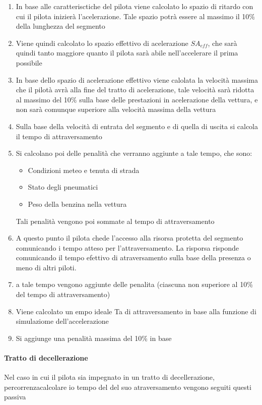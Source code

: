 \documentclass[a4paper,11pt, twoside]{book}
\begin{document}
	    \begin{enumerate}
	      \item In base alle caratterisctiche del pilota viene calcolato lo spazio di ritardo con cui il
		    pilota inizierà l'acelerazione. Tale spazio potrà essere al massimo il 10$\%$ della lunghezza del segmento
	      \item Viene quindi calcolato lo spazio effettivo di acelerazione $SA_{eff}$, che sarà quindi tanto maggiore quanto
		    il pilota sarà abile nell'accelerare il prima possibile
	      \item In base dello spazio di acelerazione effettivo viene calolata la velocità massima che il pilotà avrà alla fine del 
		    tratto di acelerazione,
		    tale velocità sarà ridotta al massimo del 10$\%$ sulla base delle prestazioni in acelerazione della vettura,
		    e non sarà comunque superiore alla velocità massima della vettura
	      \item Sulla base della velocità di entrata del segmento e di quella di uscita si calcola il tempo di attraversamento
	      \item Si calcolano poi delle penalità che verranno aggiunte a tale tempo, che sono:
		    \begin{itemize}
		      \item Condizioni meteo e tenuta di strada
		      \item Stato degli pneumatici
		      \item Peso della benzina nella vettura
		    \end{itemize}
		    Tali penalità vengono poi sommate al tempo di attraversamento
	      \item A questo punto il pilota chede l'accesso alla risorsa protetta del segmento
		    comunicando i tempo atteso per l'attraversamento. La risporsa risponde comunicando il tempo
		    efettivo di atraversamento sulla base della presenza o meno di altri piloti.
	      
	      \item a tale tempo vengono aggiunte delle penalita (ciascuna non superiore al 10\% del tempo di attraversamento)
	      \item Viene calcolato un empo ideale Ta di attraversamento in base alla funzione di simulaziome dell'accelerazione
	      \item Si aggiunge una penalità massima del 10\% in base  
	    \end{enumerate}
	    
	  \paragraph{Tratto di decellerazione}
	    Nel caso in cui il pilota sia impegnato in un tratto di decellerazione, percorrenzacalcolare io tempo del
	    del suo atraversamento vengono seguiti questi passiva
	    
\end{document}
